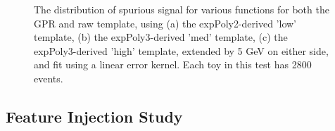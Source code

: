 \begin{figure} 
\begin{center}

\caption{The distribution of spurious signal for various functions for both the GPR and raw template, using (a) the expPoly2-derived 'low' template, (b) the expPoly3-derived 'med' template, (c) the expPoly3-derived 'high' template, extended by 5 GeV on either side, and fit using a linear error kernel. Each toy in this test has 2800 events.}
\label{fig:linearkernel_lowpt_2800_noSig}
\end{center}
\end{figure}

\clearpage


\subsection{Feature Injection Study}

